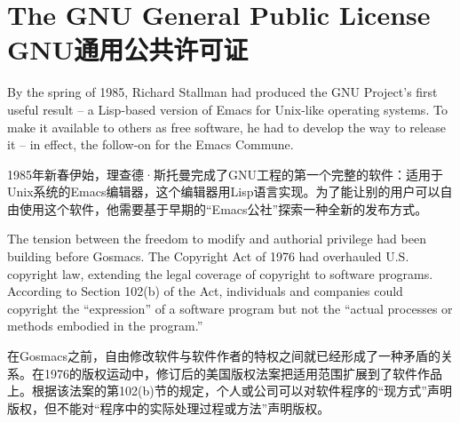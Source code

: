 
\chapter{\ifdefined\eng
The GNU General Public License
\fi
\ifdefined\chs
GNU通用公共许可证
\fi
}

\ifdefined\eng
By the spring of 1985, Richard Stallman had produced the GNU Project's first useful result -- a Lisp-based version of Emacs for Unix-like operating systems. To make it available to others as free software, he had to develop the way to release it -- in effect, the follow-on for the Emacs Commune.
\fi

\ifdefined\chs
1985年新春伊始，理查德·斯托曼完成了GNU工程的第一个完整的软件：适用于Unix系统的Emacs编辑器，这个编辑器用Lisp语言实现。为了能让别的用户可以自由使用这个软件，他需要基于早期的“Emacs公社”探索一种全新的发布方式。
\fi

\ifdefined\eng
The tension between the freedom to modify and authorial privilege had been building before Gosmacs. The Copyright Act of 1976 had overhauled U.S. copyright law, extending the legal coverage of copyright to software programs. According to Section 102(b) of the Act, individuals and companies could copyright the ``expression'' of a software program but not the ``actual processes or methods embodied in the program.''
\fi

\ifdefined\chs
在Gosmacs之前，自由修改软件与软件作者的特权之间就已经形成了一种矛盾的关系。在1976的版权运动中，修订后的美国版权法案把适用范围扩展到了软件作品上。根据该法案的第102(b)节的规定，个人或公司可以对软件程序的“现方式”声明版权，但不能对“程序中的实际处理过程或方法”声明版权。
\fi

